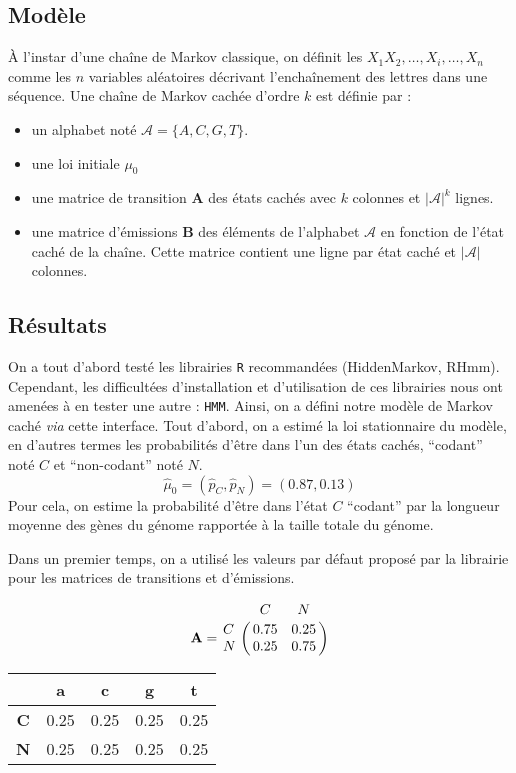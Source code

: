 \documentclass[12pt,a4paper]{article}
\begin{document}
\subsection{Modèle}

À l'instar d'une chaîne de Markov classique, on définit les $X_1X_2, \dots, X_i, \dots, X_n$ comme les $n$ variables aléatoires décrivant l'enchaînement des lettres dans une séquence.
Une chaîne de Markov cachée d'ordre $k$ est définie par :

\begin{itemize}
\item un alphabet noté $\mathcal{A} = \{A,C,G,T\}$.
\item une loi initiale $\mu_0$
\item une matrice de transition $\mathbf{A}$ des états cachés avec $k$ colonnes et $|\mathcal{A}|^k$ lignes.
\item  une matrice d'émissions  $\mathbf{B}$ des éléments de l'alphabet $\mathcal{A}$ en fonction de l'état caché de la chaîne. Cette matrice contient une ligne par état caché et $|\mathcal{A}|$ colonnes.
\end{itemize}

\subsection{Résultats}


On a tout d'abord testé les librairies \verb+R+ recommandées (HiddenMarkov, RHmm). 
Cependant, les difficultées d'installation et d'utilisation de ces librairies nous ont amenées à en tester une autre : \verb+HMM+.
Ainsi, on a défini notre modèle de Markov caché \emph{via} cette interface.
Tout d'abord, on a estimé la  loi stationnaire du modèle,  en d'autres termes les probabilités d'être dans l'un des états cachés, ``codant'' noté $C$ et ``non-codant'' noté $N$.
\[
	\hat{\mu}_0 = (\hat{p}_C,\hat{p}_N) = (0.87,0.13)
\]
Pour cela, on estime la  probabilité d'être dans l'état $C$ ``codant'' par la longueur moyenne des gènes du génome rapportée à la taille totale du génome.


Dans un premier temps,  on a  utilisé les valeurs par défaut proposé par la librairie pour les matrices de transitions et d'émissions.

\[
	\mathbf{A} = 
\bordermatrix{~ & C & N \cr
                  C & 0.75 & 0.25 \cr
                  N & 0.25 & 0.75 \cr}
\]


\begin{table}[!h]
	\centering
	\begin{tabular}{ccccc}
		& \textbf{a} & \textbf{c} & \textbf{g} & \textbf{t}\\
		\hline
		\textbf{C} & 0.25 & 0.25 & 0.25 & 0.25\\
		\textbf{N} & 0.25 & 0.25 & 0.25 & 0.25\\
		\hline
	\end{tabular}

\end{table}
\end{document}
